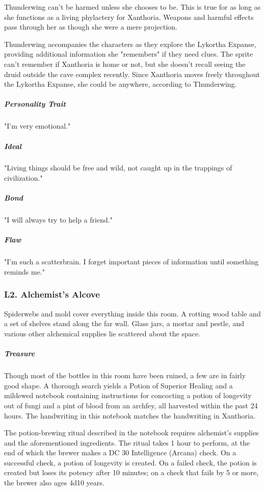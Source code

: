 \documentclass[10pt,a4paper,twoside,bg=print,twocolumn,openany,nodeprecatedcode]{dndbook}
\begin{document}
Thunderwing can't be harmed unless she chooses to be. This is true for as long as she functions as a living phylactery for Xanthoria. Weapons and harmful effects pass through her as though she were a mere projection.

Thunderwing accompanies the characters as they explore the Lykortha Expanse, providing additional information she "remembers" if they need clues. The sprite can't remember if Xanthoria is home or not, but she doesn't recall seeing the druid outside the cave complex recently. Since Xanthoria moves freely throughout the Lykortha Expanse, she could be anywhere, according to Thunderwing.

\subparagraph{Personality Trait}
"I'm very emotional."

\subparagraph{Ideal}
"Living things should be free and wild, not caught up in the trappings of civilization."

\subparagraph{Bond}
"I will always try to help a friend."

\subparagraph{Flaw}
"I'm such a scatterbrain. I forget important pieces of information until something reminds me."

\subsubsection{L2. Alchemist's Alcove}
\begin{DndReadAloud}{}
Spiderwebs and mold cover everything inside this room. A rotting wood table and a set of shelves stand along the far wall. Glass jars, a mortar and pestle, and various other alchemical supplies lie scattered about the space.

\end{DndReadAloud}

\subparagraph{Treasure}
Though most of the bottles in this room have been ruined, a few are in fairly good shape. A thorough search yields a Potion of Superior Healing and a mildewed notebook containing instructions for concocting a potion of longevity out of fungi and a pint of blood from an archfey, all harvested within the past 24 hours. The handwriting in this notebook matches the handwriting in Xanthoria.

The potion-brewing ritual described in the notebook requires alchemist's supplies and the aforementioned ingredients. The ritual takes 1 hour to perform, at the end of which the brewer makes a DC 30 Intelligence (Arcana) check. On a successful check, a potion of longevity is created. On a failed check, the potion is created but loses its potency after 10 minutes; on a check that fails by 5 or more, the brewer also ages 4d10 years.
\end{document}
